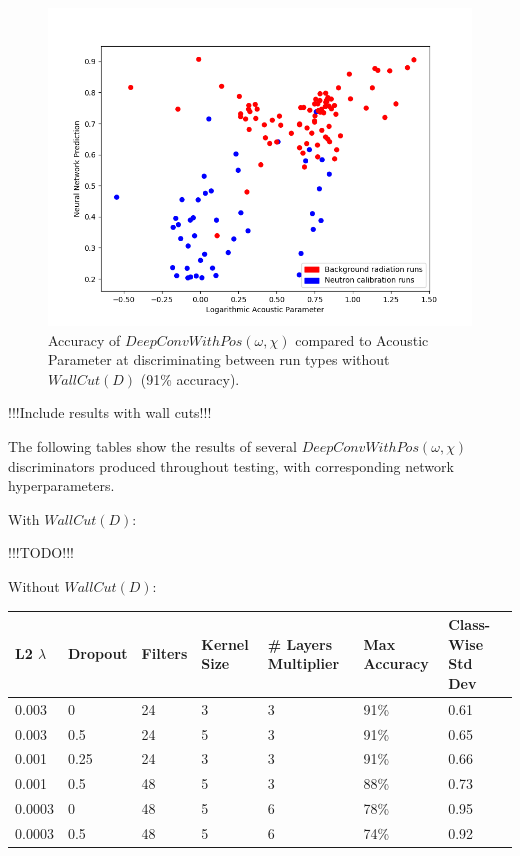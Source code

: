 \documentclass[10pt]{article}
\begin{document}
\begin{figure}[h]
    \centering
    \includegraphics[width=\textwidth]{waveform_best_validation}
    \caption{\label{waveform_best_validation} Accuracy of $DeepConvWithPos(\omega, \chi)$ compared to Acoustic Parameter at discriminating between run types without $WallCut(D)$ (91\% accuracy).}
\end{figure}

!!!Include results with wall cuts!!!

The following tables show the results of several $DeepConvWithPos(\omega, \chi)$ discriminators produced throughout testing, with corresponding network hyperparameters.

With $WallCut(D)$:

!!!TODO!!!

Without $WallCut(D)$:

\begin{tabular}{|l|l|l|l|l|l|l|}
    \hline
    L2 $\lambda$ & Dropout & Filters & Kernel Size & \# Layers Multiplier & Max Accuracy & Class-Wise Std Dev \\
    \hline
    0.003 & 0 & 24 & 3 & 3 & 91\% & 0.61 \\
    \hline
    0.003 & 0.5 & 24 & 5 & 3 & 91\% & 0.65 \\
    \hline
    0.001 & 0.25 & 24 & 3 & 3 & 91\% & 0.66 \\
    \hline
    0.001 & 0.5 & 48 & 5 & 3 & 88\% & 0.73 \\
    \hline
    0.0003 & 0 & 48 & 5 & 6 & 78\% & 0.95 \\
    \hline
    0.0003 & 0.5 & 48 & 5 & 6 & 74\% & 0.92 \\
    \hline
\end{tabular}
\end{document}

